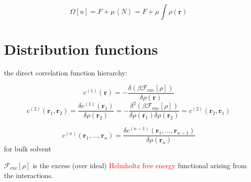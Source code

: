 \[
\Omega\left[u\right]=F+\mu\left\langle N\right\rangle =F+\mu\int\rho(\mathbf{r})
\]



\section{Distribution functions}

the direct correlation function hierarchy:

\[
c^{(1)}(\mathbf{r})=-\dfrac{\delta(\beta\mathcal{F}_{\mathrm{exc}}[\rho])}{\delta\rho(\mathbf{r})}
\]
\[
c^{(2)}(\mathbf{r}_{1},\mathbf{r}_{2})=\dfrac{\delta c^{(1)}(\mathbf{r}_{1})}{\delta\rho(\mathbf{r}_{2})}=-\dfrac{\delta^{2}(\beta\mathcal{F}_{\mathrm{exc}}[\rho])}{\delta\rho(\mathbf{r}_{1})\delta\rho(\mathbf{r}_{2})}=c^{(2)}(\mathbf{r}_{2},\mathbf{r}_{1})
\]


\[
c^{(n)}(\mathbf{r}_{1},\ldots,\mathbf{r}_{n})=\dfrac{\delta c^{(n-1)}(\mathbf{r}_{1},\ldots,\mathbf{r}_{n-1})}{\delta\rho(\mathbf{r}_{n})}
\]
for bulk solvent

$\mathcal{F}_{\mathrm{exc}}[\rho]$ is the excess (over ideal) \textcolor{red}{Helmholtz
free energy} functional arising from the interactions.
